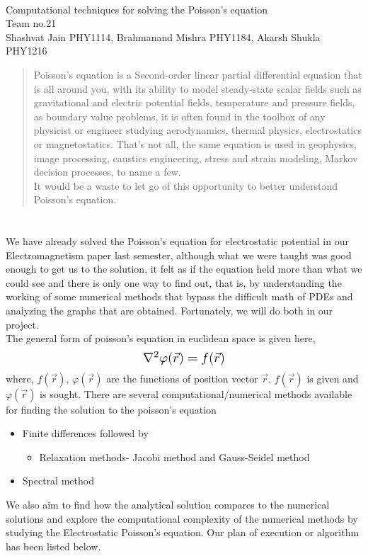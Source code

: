 \documentclass[letterpaper,11pt]{article}
\newcommand{\newsection}[1]{\section{\sffamily{\bfseries{#1}}}}
\begin{document}
	\begin{center}
		 \\[4mm]
		\large{ Computational techniques for solving the Poisson’s equation} \\[4mm]
		\large{\textcolor{greyish}{Team no.21}} \\[1mm]
		\large{\textcolor{greyish}{Shashvat Jain PHY1114, Brahmanand Mishra PHY1184, Akarsh Shukla PHY1216}}\\[3mm]
		\begin{abstract}
			\noindent
			Poisson's equation is a Second-order linear partial differential equation that is all around you, with its ability to model steady-state scalar fields such as gravitational and electric potential fields, temperature and pressure fields, as boundary value problems, it is often found in the toolbox of any physicist or engineer studying aerodynamics, thermal physics, electrostatics or magnetostatics. That’s not all, the same equation is used in geophysics, image processing, caustics engineering, stress and strain modeling, Markov decision processes, to name a few.
\\ \noindent
			It would be a waste to let go of this opportunity to better understand Poisson's equation.  
		\end{abstract}	
	\end{center}
	
	\newsection{PROJECT SYNOPSIS}
	\noindent
	We have already solved the Poisson’s equation for electrostatic potential in our Electromagnetism paper last semester, although what we were taught was good enough to get us to the solution, it felt as if the equation held more than what we could see and there is only one way to find out, that is, by understanding the working of some numerical methods that bypass the difficult math of PDEs and analyzing the graphs that are obtained. Fortunately, we will do both in our project.\\
	The general form of poisson's equation in euclidean space is given here,
	\[
		\scalebox{1.3}{$\nabla^2 \varphi(\vec{r}) = f(\vec{r})$}
	\]
	where, $f(\vec{r})$, $\varphi(\vec{r})$ are the functions of position vector $\vec{r}$. $f(\vec{r})$ is given and $\varphi(\vec{r})$ is sought. 
	\noindent
	There are several computational/numerical methods available for finding the solution to the poisson's equation 
	\begin{itemize}
		\setlength\itemsep{0.01mm}
		\item Finite differences followed by 
		\begin{itemize}
			\item Relaxation methods- Jacobi method and Gauss-Seidel method
		\end{itemize}
		\item Spectral method 
	\end{itemize}
	\noindent
	We also aim to find how the analytical solution compares to the numerical solutions and explore the computational complexity of the numerical methods by studying the Electrostatic Poisson’s equation. Our plan of execution or algorithm has been listed below. 
	
\end{document}
